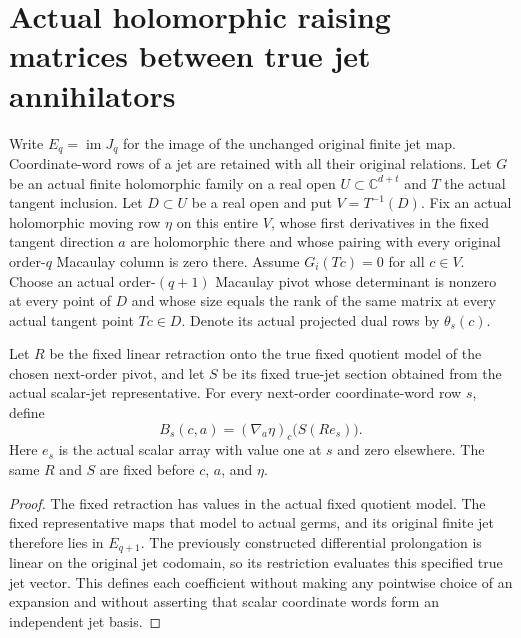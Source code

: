 \section{Actual holomorphic raising matrices between true jet annihilators}

Write $E_q=\operatorname{im}J_q$ for the image of the unchanged original
finite jet map. Coordinate-word rows of a jet are retained with all their
original relations. Let $G$ be an actual finite holomorphic family on a
real open $U\subset\mathbb C^{d+t}$ and $T$ the actual tangent inclusion.
Let $D\subset U$ be a real open and put $V=T^{-1}(D)$. Fix an
actual holomorphic moving row $\eta$ on this entire $V$, whose first
derivatives in the fixed tangent direction $a$ are holomorphic there
and whose pairing with every original order-$q$ Macaulay column is
zero there. Assume $G_i(Tc)=0$ for all $c\in V$. Choose an actual
order-$(q+1)$ Macaulay pivot whose determinant is nonzero at every
point of $D$ and whose size equals the rank of the same matrix
at every actual tangent point $Tc\in D$.
Denote its actual projected dual rows by $\theta_s(c)$.

\begin{definition}
\label{hir:actual-dual-jet-raising-coefficients}
\leanok
Let $R$ be the fixed linear retraction onto the true fixed quotient
model of the chosen next-order pivot, and let $S$ be its fixed true-jet
section obtained from the actual scalar-jet representative. For every
next-order coordinate-word row $s$, define
\[
 B_s(c,a)=(\nabla_a\eta)_c\bigl(S(R e_s)\bigr).
\]
Here $e_s$ is the actual scalar array with value one at $s$ and zero
elsewhere. The same $R$ and $S$ are fixed before $c$, $a$, and $\eta$.
\end{definition}
\begin{proof}
The fixed retraction has values in the actual fixed quotient model.
The fixed representative maps that model to actual germs, and its
original finite jet therefore lies in $E_{q+1}$. The previously
constructed differential prolongation is linear on the original jet
codomain, so its restriction evaluates this specified true jet vector.
This defines each coefficient without making any pointwise choice of an
expansion and without asserting that scalar coordinate words form an
independent jet basis.
\end{proof}

